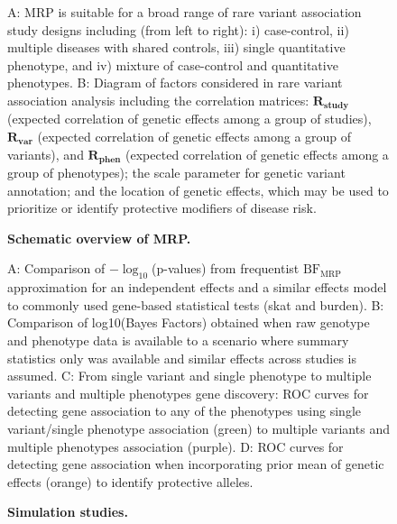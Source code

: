 \begin{figure}[!h]
\caption{{\bf Schematic overview of MRP.}}
\label{overview}
A: MRP is suitable for a broad range of rare variant association study designs including (from left to right): i) case-control, ii) multiple diseases with shared controls, iii) single quantitative phenotype, and iv) mixture of case-control and quantitative phenotypes. B: Diagram of factors considered in rare variant association analysis including the correlation matrices: $\mathbf{R_{\textrm{study}}}$  (expected correlation of genetic effects among a group of studies), $\mathbf{R_{\textrm{var}}}$ (expected correlation of genetic effects among a group of variants), and $\mathbf{R_{\textrm{phen}}}$ (expected correlation of genetic effects among a group of phenotypes); the scale parameter for genetic variant annotation; and the location of genetic effects, which may be used to prioritize or identify protective modifiers of disease risk.
\end{figure}

\begin{figure}[!h]
\caption{{\bf Simulation studies.}}
\label{simresults}
A: Comparison of $-\log_{10}$(p-values) from frequentist $\textrm{BF}_{\textrm{MRP}}$ approximation for an independent effects and a similar effects model to commonly used gene-based statistical tests (skat and burden). B: Comparison of log10(Bayes Factors) obtained when raw genotype and phenotype data is available to a scenario where summary statistics only was available and similar effects across studies is assumed. C: From single variant and single phenotype to multiple variants and multiple phenotypes gene discovery: ROC curves for detecting gene association to any of the phenotypes using single variant/single phenotype association (green) to multiple variants and multiple phenotypes association (purple). D: ROC curves for detecting gene association when incorporating prior mean of genetic effects (orange) to identify protective alleles.
\end{figure}

